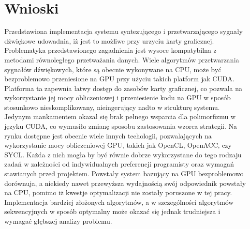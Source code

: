 \chapter{Wnioski}

Przedstawiona implementacja systemu syntezującego i przetwarzającego sygnały dźwiękowe udowadnia, iż jest to możliwe przy urzyciu karty graficznej. Problematyka przedstawionego zagadnienia jest wysoce kompatybilna z metodami równoległego przetważania danych. Wiele algorytmów przetwarzania sygnałów dźwiękowych, które są obecnie wykonywane na CPU, może być bezproblemowo przeniesione na GPU przy użyciu takich platform jak CUDA. Platforma ta zapewnia łatwy dostęp do zasobów karty graficznej, co pozwala na wykorzystanie jej mocy obliczeniowej i przeniesienie kodu na GPU w sposób stosunkowo nieskomplikowany, nieingerujący nadto w strukturę systemu. Jedynym mankamentem okazał się brak pełnego wsparcia dla polimorfizmu w języku CUDA, co wymusiło zmianę sposobu zastosowania wzorca strategii. Na rynku dostępne jest obecnie wiele innych techologii, pozwalających na wykorzystanie mocy obliczeniowej GPU, takich jak OpenCL, OpenACC, czy SYCL. Każda z nich mogła by być równie dobrze wykorzystane do tego rodzaju zadań w zależności od indywidualnych preferencji programisty oraz wymagań stawianych przed projektem. Powstały system bazujący na GPU bezproblemowo dorównuja, a niekiedy nawet przewyższa wydajnością swój odpowiednik powstały na CPU, pomimo iż kwestje optymalizacji nie zostały poruszone w tej pracy. Implementacja bardziej złożonych algorytmów, a w szczególności algorytmów sekwencyjnych w sposób optymalny może okazać się jednak trudniejsza i wymagać głębszej analizy problemu. 


